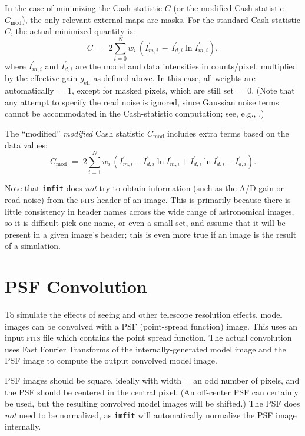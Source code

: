 \documentclass[10pt,a4paper,article]{memoir}
\newcommand{\imfit}{\texttt{imfit}}
\begin{document}
In the case of minimizing the Cash statistic $C$ (or the modified Cash statistic 
$C_{\mathrm{mod}}$), the only relevant external maps are masks. For the standard 
Cash statistic $C$, the actual minimized quantity is:
\begin{equation}
C \; = \; 2 \sum_{i = 0}^{N} w_{i} \, (I^{\prime}_{m, i} \, - \, I^{\prime}_{d, i} \ln I^{\prime}_{m, i}),
\end{equation}
where $I^{\prime}_{m, i}$ and $I^{\prime}_{d, i}$ are the model and data
intensities in counts/pixel, multiplied by the effective gain $g_{\mathrm{eff}}$ as defined 
above.  In this case, all weights are automatically $=1$, except for masked pixels, which 
are still set $= 0$. (Note that any attempt to specify the read noise is ignored, since 
Gaussian noise terms cannot be
accommodated in the Cash-statistic computation; see, e.g., \citealt{erwin14}.)

The ``modified'' \textit{modified} Cash statistic $C_{\mathrm{mod}}$ includes extra terms 
based on the data values:
\begin{equation}
C_{\mathrm{mod}} \; = \;  2 \sum_{i = 1}^{N} w_{i} \, 
\left( I^{\prime}_{m, i} - I^{\prime}_{d, i} \ln I^{\prime}_{m, i} + I^{\prime}_{d, i} \ln I^{\prime}_{d, i} - I^{\prime}_{d, i} \right).
\end{equation}

Note that \imfit{} does \textit{not} try to obtain information (such as
the A/D gain or read noise) from the \textsc{fits} header of an image. This is primarily
because there is little consistency in header names across the wide range of
astronomical images, so it is difficult pick one name, or even a small set, and
assume that it will be present in a given image's header; this is even more
true if an image is the result of a simulation.




\section{PSF Convolution}

To simulate the effects of seeing and other telescope resolution effects, model
images can be convolved with a PSF (point-spread function) image. This uses an
input \textsc{fits} file which contains the point spread function. The actual convolution
uses Fast Fourier Transforms of the internally-generated model image and the PSF
image to compute the output convolved model image.

PSF images should be square, ideally with width = an odd number of pixels, and
the PSF should be centered in the central pixel. (An off-center PSF can certainly
be used, but the resulting convolved model images will be shifted.) The PSF does
\textit{not} need to be normalized, as \imfit{} will automatically normalize the
PSF image internally.
\end{document}
